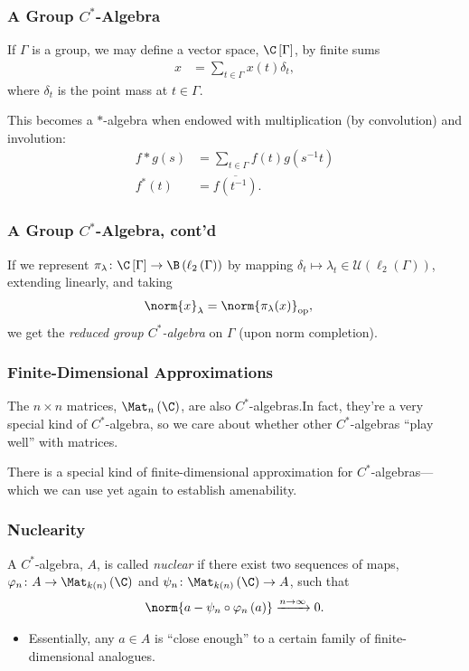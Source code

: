 \documentclass{beamer-custom}
\DeclareMathOperator{\op}{op}
\begin{document}
\begin{frame}
  \frametitle{A Group $C^{\ast}$-Algebra}
  If $\Gamma$ is a group, we may define a vector space, $\C\left[ \Gamma \right]$, by finite sums
  \begin{align*}
    x &= \sum_{t\in\Gamma}x(t)\delta_t,
  \end{align*}
  where $\delta_t$ is the point mass at $t\in \Gamma$.\pause\newline

  This becomes a $\ast$-algebra when endowed with multiplication (by convolution) and involution:
  \begin{align*}
    f\ast g(s) &= \sum_{t\in\Gamma}f(t)g\left( s^{-1}t \right)\\
    f^{\ast}(t) &= \overline{f\left( t^{-1} \right)}.
  \end{align*}
\end{frame}
\begin{frame}
  \frametitle{A Group $C^{\ast}$-Algebra, cont'd}
  If we represent $\pi_{\lambda}\colon \C\left[ \Gamma \right]\rightarrow \B\left( \ell_2\left( \Gamma \right) \right)$ by mapping $\delta_t \mapsto \lambda_{t}\in \mathcal{U}\left( \ell_2\left( \Gamma \right) \right)$, extending linearly, and taking
  \begin{align*}
    \norm{x}_{\lambda} &= \norm{\pi_{\lambda}(x)}_{\op},
  \end{align*}
  we get the \textit{reduced group $C^{\ast}$-algebra} on $\Gamma$ (upon norm completion).
\end{frame}
\begin{frame}
  \frametitle{Finite-Dimensional Approximations}
  The $n\times n$ matrices, $\Mat_n\left( \C \right)$, are also $C^{\ast}$-algebras.\pause\:In fact, they're a very special kind of $C^{\ast}$-algebra, so we care about whether other $C^{\ast}$-algebras ``play well'' with matrices.\pause\newline

  There is a special kind of finite-dimensional approximation for $C^{\ast}$-algebras\pause\:--- which we can use yet again to establish amenability.
\end{frame}
\begin{frame}
  \frametitle{Nuclearity}
  A $C^{\ast}$-algebra, $A$, is called \textit{nuclear} if there exist two sequences of maps, $\varphi_n\colon A\rightarrow \Mat_{k(n)}\left( \C \right)$ and $\psi_n\colon \Mat_{k(n)}\left( \C \right)\rightarrow A$, such that
  \begin{align*}
    \norm{a - \psi_n\circ\varphi_n\left( a \right)} \xrightarrow{n\rightarrow\infty} 0.
  \end{align*}\pause
  \begin{itemize}
    \item Essentially, any $a\in A$ is ``close enough'' to a certain family of finite-dimensional analogues.
  \end{itemize}
\end{frame}
\end{document}

